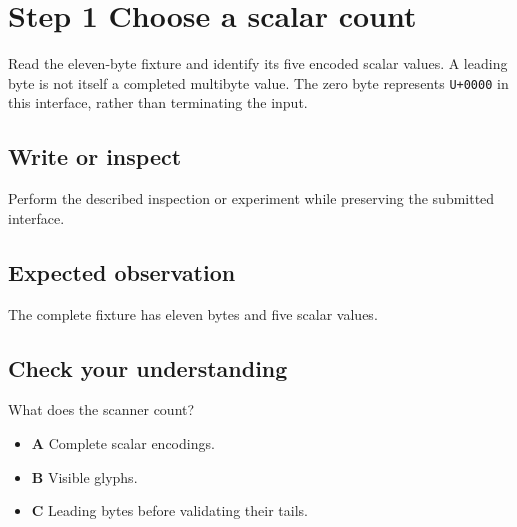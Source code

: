 \section{Step 1 Choose a scalar count}\label{utf8-s01}

Read the eleven-byte fixture and identify its five encoded scalar values. A leading byte is not itself a completed multibyte value. The zero byte represents \texttt{U+0000} in this interface, rather than terminating the input.

\subsection{Write or inspect}
Perform the described inspection or experiment while preserving the submitted interface.

\subsection{Expected observation}
The complete fixture has eleven bytes and five scalar values.

\subsection{Check your understanding}
What does the scanner count?

\begin{itemize}
  \item \textbf{A} Complete scalar encodings.
  \item \textbf{B} Visible glyphs.
  \item \textbf{C} Leading bytes before validating their tails.
\end{itemize}
